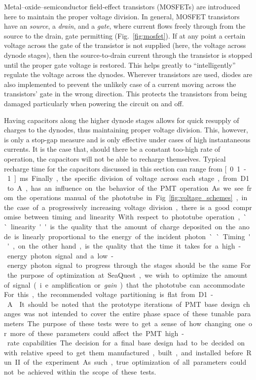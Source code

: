 Metal–oxide–semiconductor field-effect transistors (MOSFETs) are introduced here to maintain the proper voltage division. In general, MOSFET transistors have an \emph{source}, a \emph{drain}, and a \emph{gate}, where current flows freely through from the source to the drain, gate permitting (Fig.~\ref{fig:mosfet}). If at any point a certain voltage across the gate of the transistor is not supplied (here, the voltage across dynode stages), then the source-to-drain current through the transistor is stopped until the proper gate voltage is restored. This helps greatly to ``intelligently'' regulate the voltage across the dynodes. Wherever transistors are used, diodes are also implemented to prevent the unlikely case of a current moving across the transistors' gate in the wrong direction. This protects the transistors from being damaged particularly when powering the circuit on and off.

Having capacitors along the higher dynode stages allows for quick resupply of charges to the dynodes, thus maintaining proper voltage division. This, however, is only a stop-gap measure and is only effective under cases of high instantaneous currents. It is the case that, should there be a constant too-high rate of operation, the capacitors will not be able to recharge themselves. Typical recharge time for the capacitors discussed in this section can range from \unit[0.1-1]{ms}.

Finally, the specific division of voltage across each stage, from D1 to A, has an influence on the behavior of the PMT operation. As we see from the operations manual of the phototube in Fig.~\ref{fig:voltage_schemes}, in the case of a progressively increasing voltage division, there is a good compromise between timing and linearity. With respect to phototube operation, ``linearity'' is the quality that the amount of charge deposited on the anode is linearly proportional to the energy of the incident photon. ``Timing'', on the other hand, is the quality that the time it takes for a high-energy photon signal and a low-energy photon signal to progress through the stages should be the same. For the purpose of optimization at SeaQuest, we wish to optimize the amount of signal (i.e. amplification or \emph{gain}) that the phototube can accommodate. For this, the recommended voltage partitioning is flat from D1-A~\cite{tubespecs}.

It should be noted that the prototype iterations of PMT base design changes was not intended to cover the entire phase space of these tunable parameters. The purpose of these tests were to get a sense of how changing one or more of these parameters could affect the PMT high-rate capabilities. The decision for a final base design had to be decided on with relative speed to get them manufactured, built, and installed before Run II of the experiment. As such, true optimization of all parameters could not be achieved within the scope of these tests.

